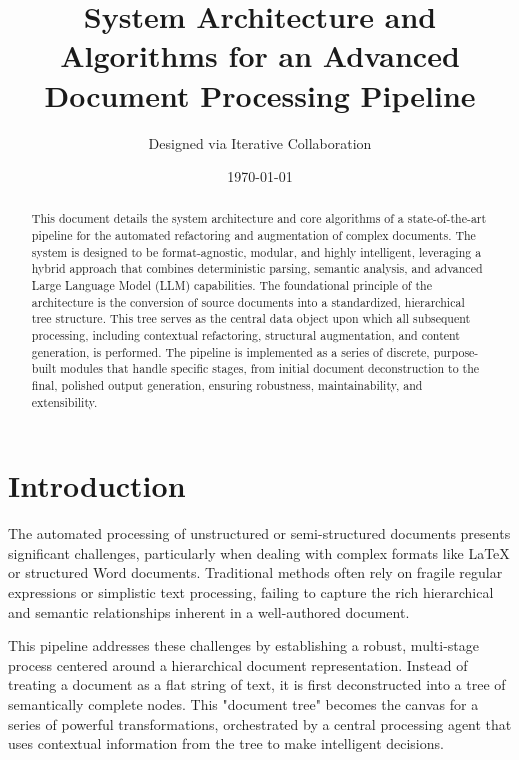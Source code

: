 \documentclass{article}
\title{System Architecture and Algorithms for an Advanced Document Processing Pipeline}
\author{Designed via Iterative Collaboration}
\date{\today}
\begin{document}
\maketitle

\begin{abstract}
This document details the system architecture and core algorithms of a state-of-the-art pipeline for the automated refactoring and augmentation of complex documents. The system is designed to be format-agnostic, modular, and highly intelligent, leveraging a hybrid approach that combines deterministic parsing, semantic analysis, and advanced Large Language Model (LLM) capabilities. The foundational principle of the architecture is the conversion of source documents into a standardized, hierarchical tree structure. This tree serves as the central data object upon which all subsequent processing, including contextual refactoring, structural augmentation, and content generation, is performed. The pipeline is implemented as a series of discrete, purpose-built modules that handle specific stages, from initial document deconstruction to the final, polished output generation, ensuring robustness, maintainability, and extensibility.
\end{abstract}

\section{Introduction}
The automated processing of unstructured or semi-structured documents presents significant challenges, particularly when dealing with complex formats like LaTeX or structured Word documents. Traditional methods often rely on fragile regular expressions or simplistic text processing, failing to capture the rich hierarchical and semantic relationships inherent in a well-authored document.

This pipeline addresses these challenges by establishing a robust, multi-stage process centered around a hierarchical document representation. Instead of treating a document as a flat string of text, it is first deconstructed into a tree of semantically complete nodes. This "document tree" becomes the canvas for a series of powerful transformations, orchestrated by a central processing agent that uses contextual information from the tree to make intelligent decisions.
\end{document}
